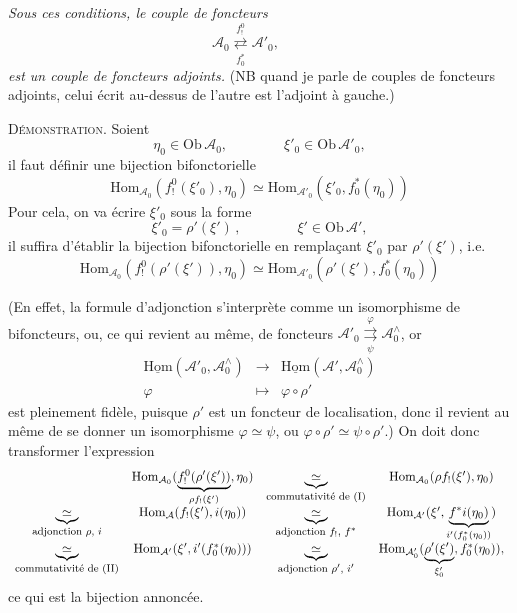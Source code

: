 \documentclass[11pt]{article}
\newcommand{\printedpage}[1]{\marginpar{\footnotesize p.~#1}}
\newcommand{\msp}[1]{\marginpar{\footnotesize [#1]}}
\newcommand{\Ob}{\mathrm{Ob}\,}
\newcommand{\Hom}{\mathrm{Hom}}
\newcommand{\uHom}{\underline{\mathrm{Hom}}}
\newcommand{\cA}{\mathcal{A}}
\newcommand{\adj}[2]{\mathrel{\underset{#2}{\overset{#1}{\rightleftarrows}}}}
\begin{document}
\textit{Sous ces conditions, le couple de foncteurs}
\[
\cA_0 \adj{f_!^0}{f_0^*} \cA'_0, \qquad
\]
\textit{est un couple de foncteurs adjoints.} (NB quand je parle de couples de foncteurs adjoints, celui écrit au-dessus de l'autre est l'adjoint à gauche.)

\textsc{Démonstration}. Soient
\[
\eta_0 \in \Ob \cA_0, \qquad\qquad \xi'_0 \in \Ob \cA'_0,
\]
il faut définir une bijection bifonctorielle
\[
\Hom_{\cA_0}(f_!^0(\xi'_0), \eta_0) \simeq \Hom_{\cA'_0}(\xi'_0, f_0^*(\eta_0))
\]
Pour cela, on va écrire $\xi'_0$ sous la forme
\[
\xi'_0 = \rho'(\xi')\,, \qquad\qquad \xi' \in \Ob \cA',
\]
il suffira d'établir la bijection bifonctorielle en remplaçant $\xi'_0$ par $\rho'(\xi')$, i.e.
\[
\Hom_{\cA_0}(f_!^0(\rho'(\xi')), \eta_0) \simeq \Hom_{\cA'_0}(\rho'(\xi'), f_0^*(\eta_0))
\]


\printedpage{92}

\msp{page 150}
(En effet, la formule d'adjonction s'interprète comme un isomorphisme de bifoncteurs, ou, ce qui revient au même, de foncteurs $\cA'_0 \mathrel{\underset{\psi}{\overset{\varphi}{\rightrightarrows}}} \cA_0^{\wedge}$, or
\[
\begin{array}{ccc}
\uHom(\cA'_0, \cA_0^{\wedge}) & \longrightarrow & \uHom(\cA', \cA_0^{\wedge}) \\[1ex]
\varphi & \longmapsto & \varphi \circ \rho'
\end{array}
\]
est pleinement fidèle, puisque $\rho'$ est un foncteur de localisation, donc il revient au même de se donner un isomorphisme $\varphi \simeq \psi$, ou $\varphi \circ \rho' \simeq \psi \circ \rho'$.) On doit donc transformer l'expression
\[
\begin{array}{cccc}
 & \Hom_{\cA_0}(\underbrace{f_!^0(\rho'(\xi'))}_{\rho f_!(\xi')}, \eta_0) & \underbrace{\simeq}_{\text{\footnotesize commutativité de (I)}} & \Hom_{\cA_0}(\rho f_!(\xi'), \eta_0) \\[3ex]
\underbrace{\simeq}_{\text{\footnotesize adjonction $\rho$, $i$}} & \Hom_{\cA}(f_!(\xi'), i(\eta_0)) & \underbrace{\simeq}_{\text{\footnotesize adjonction $f_!$, $f^*$}} & \Hom_{\cA'}(\xi', \underbrace{f^*i(\eta_0)}_{i'(f_0^*(\eta_0))}) \\[3ex]
\underbrace{\simeq}_{\text{\footnotesize commutativité de (II)}} & \Hom_{\cA'}(\xi', i'(f_0^*(\eta_0))) & \underbrace{\simeq}_{\text{\footnotesize adjonction $\rho'$, $i'$}} & \Hom_{\cA'_0}(\underbrace{\rho'(\xi')}_{\xi'_0}, f_0^*(\eta_0)),
\end{array}
\]
ce qui est la bijection annoncée.
\end{document}
